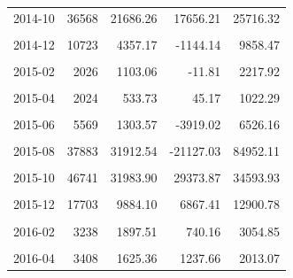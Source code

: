 \begin{longtable}[t]{crrrr}
2014-10 & 36568 & 21686.26 & 17656.21 & 25716.32\\
\cellcolor{gray!10}{2014-11} & \cellcolor{gray!10}{17667} & \cellcolor{gray!10}{8020.60} & \cellcolor{gray!10}{-15826.23} & \cellcolor{gray!10}{31867.44}\\
2014-12 & 10723 & 4357.17 & -1144.14 & 9858.47\\
\cellcolor{gray!10}{2015-01} & \cellcolor{gray!10}{4313} & \cellcolor{gray!10}{2011.52} & \cellcolor{gray!10}{1181.01} & \cellcolor{gray!10}{2842.04}\\
2015-02 & 2026 & 1103.06 & -11.81 & 2217.92\\
\cellcolor{gray!10}{2015-03} & \cellcolor{gray!10}{1659} & \cellcolor{gray!10}{-339.59} & \cellcolor{gray!10}{-1806.73} & \cellcolor{gray!10}{1127.55}\\
2015-04 & 2024 & 533.73 & 45.17 & 1022.29\\
\cellcolor{gray!10}{2015-05} & \cellcolor{gray!10}{2169} & \cellcolor{gray!10}{-487.50} & \cellcolor{gray!10}{-2640.77} & \cellcolor{gray!10}{1665.78}\\
2015-06 & 5569 & 1303.57 & -3919.02 & 6526.16\\
\cellcolor{gray!10}{2015-07} & \cellcolor{gray!10}{8541} & \cellcolor{gray!10}{1739.66} & \cellcolor{gray!10}{-7363.69} & \cellcolor{gray!10}{10843.02}\\
2015-08 & 37883 & 31912.54 & -21127.03 & 84952.11\\
\cellcolor{gray!10}{2015-09} & \cellcolor{gray!10}{61739} & \cellcolor{gray!10}{33884.44} & \cellcolor{gray!10}{8588.48} & \cellcolor{gray!10}{59180.39}\\
2015-10 & 46741 & 31983.90 & 29373.87 & 34593.93\\
\cellcolor{gray!10}{2015-11} & \cellcolor{gray!10}{26411} & \cellcolor{gray!10}{15634.02} & \cellcolor{gray!10}{1625.14} & \cellcolor{gray!10}{29642.90}\\
2015-12 & 17703 & 9884.10 & 6867.41 & 12900.78\\
\cellcolor{gray!10}{2016-01} & \cellcolor{gray!10}{5960} & \cellcolor{gray!10}{3145.06} & \cellcolor{gray!10}{2389.66} & \cellcolor{gray!10}{3900.45}\\
2016-02 & 3238 & 1897.51 & 740.16 & 3054.85\\
\cellcolor{gray!10}{2016-03} & \cellcolor{gray!10}{3425} & \cellcolor{gray!10}{2669.36} & \cellcolor{gray!10}{1978.73} & \cellcolor{gray!10}{3359.99}\\
2016-04 & 3408 & 1625.36 & 1237.66 & 2013.07\\

\end{longtable}
